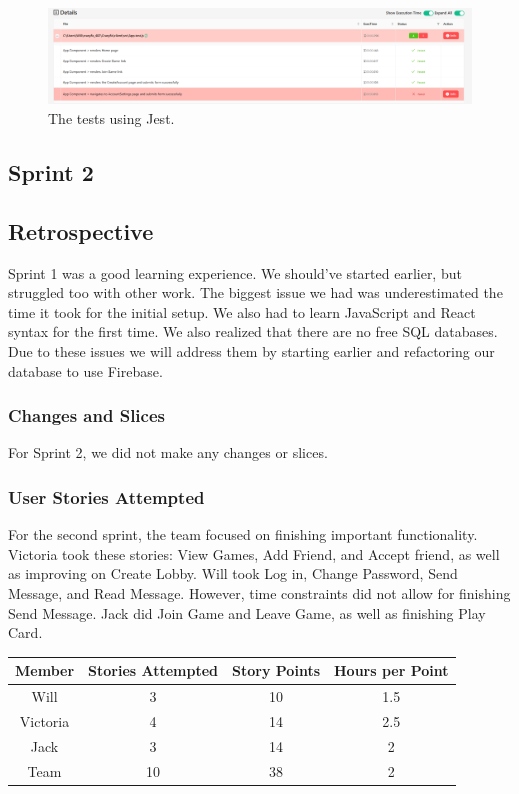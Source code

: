 \documentclass{article}
\begin{document}
\begin{figure}[h]
\centering
\includegraphics[width=\linewidth]{tests2.png}
\caption{\label{fig:test2}The tests using Jest.}
\end{figure}

\subsection{Sprint 2}

\subsection{Retrospective}
Sprint 1 was a good learning experience. We should've started earlier, but struggled too with other work. The biggest issue we had was underestimated the time it took for the initial setup. We also had to learn JavaScript and React syntax for the first time. We also realized that there are no free SQL databases. Due to these issues we will address them by starting earlier and refactoring our database to use Firebase.

\subsubsection{Changes and Slices}
For Sprint 2, we did not make any changes or slices.

\subsubsection{User Stories Attempted}

For the second sprint, the team focused on finishing important functionality. Victoria took these stories: View Games, Add Friend, and Accept friend, as well as improving on Create Lobby. Will took Log in, Change Password, Send Message, and Read Message. However, time constraints did not allow for finishing Send Message. Jack did Join Game and Leave Game, as well as finishing Play Card.

\begin{table}[h]
\centering
\begin{tabular}{|c|c|c|c|}
\hline
\textbf{Member} & \textbf{Stories Attempted} & \textbf{Story Points} & \textbf{Hours per Point} \\ \hline
Will     & 3 & 10  & 1.5 \\ \hline
Victoria & 4 & 14 & 2.5 \\ \hline
Jack     & 3 & 14 & 2 \\ \hline
Team    & 10 & 38 & 2 \\ \hline
\end{tabular}
\end{table}
\end{document}
